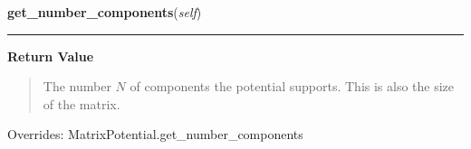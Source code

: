 \hspace{.8\funcindent}\begin{boxedminipage}{\funcwidth}

    \raggedright \textbf{get\_number\_components}(\textit{self})

    \vspace{-1.5ex}

    \rule{\textwidth}{0.5\fboxrule}
\setlength{\parskip}{2ex}
\setlength{\parskip}{1ex}
      \textbf{Return Value}
    \vspace{-1ex}

      \begin{quote}
      The number $N$ of components the potential supports. This is also
      the size of the matrix.

      \end{quote}



      Overrides: MatrixPotential.get\_number\_components

    \end{boxedminipage}

    \vspace{0.5ex}

